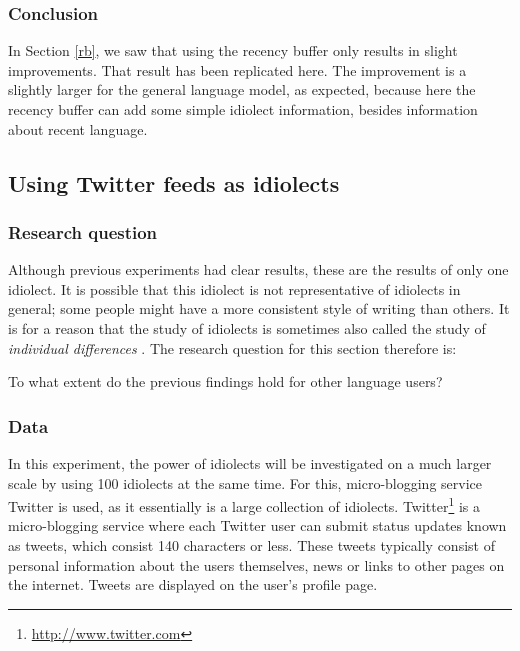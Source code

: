 \documentclass[11pt]{article}
\begin{document}
\subsubsection{Conclusion}
In Section \ref{rb}, we saw that using the recency buffer only results in slight improvements. That result has been replicated here. The improvement is a slightly larger for the general language model, as expected, because here the recency buffer can add some simple idiolect information, besides information about recent language.

\subsection{Using Twitter feeds as idiolects} \label{twitter_idiolects}

\subsubsection{Research question}
Although previous experiments had clear results, these are the results of only one idiolect. It is possible that this idiolect is not representative of idiolects in general; some people might have a more consistent style of writing than others. It is for a reason that the study of idiolects is sometimes also called the study of \emph{individual differences} \cite{barlow10}. The research question for this section therefore is:

\begin{examples}
\item To what extent do the previous findings hold for other language users?
\end{examples}

\subsubsection{Data} \label{data_twitter_idiolects}
In this experiment, the power of idiolects will be investigated on a much larger scale by using 100 idiolects at the same time. For this, micro-blogging service Twitter is used, as it essentially is a large collection of idiolects. Twitter\footnote{\url{http://www.twitter.com}} is a micro-blogging service where each Twitter user can submit status updates known as tweets, which consist 140 characters or less. These tweets typically consist of personal information about the users themselves, news or links to other pages on the internet. Tweets are displayed on the user's profile page. 
\end{document}
